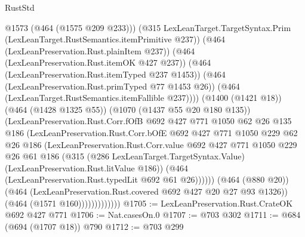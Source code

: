 \begin{lexlean}{RustStd}
\begin{coremodule}
                                  @1573
                                  (@464 (@1575 @209 @233)))
                                (@315
                                  LexLeanTarget.TargetSyntax.Prim
                                  (LexLeanTarget.RustSemantics.itemPrimitive @237))
                                (@464 (LexLeanPreservation.Rust.plainItem @237))
                                (@464 (LexLeanPreservation.Rust.itemOK @427 @237))
                                (@464 (LexLeanPreservation.Rust.itemTyped @237 @1453))
                                (@464 (LexLeanPreservation.Rust.primTyped @77 @1453 @26))
                                (@464 (LexLeanTarget.RustSemantics.itemFallible @237))))
                            (@1400 (@1421 @18))
                            (@464 (@1428 @1325 @55))
                            (@1070 (@1437 @55 @20 @180 @135))
                            (LexLeanPreservation.Rust.Corr.fOfB
                              @692
                              @427
                              @771
                              @1050
                              @62
                              @26
                              @135
                              @186
                              (LexLeanPreservation.Rust.Corr.bOfE
                                @692
                                @427
                                @771
                                @1050
                                @229
                                @62
                                @26
                                @186
                                (LexLeanPreservation.Rust.Corr.value
                                  @692
                                  @427
                                  @771
                                  @1050
                                  @229
                                  @26
                                  @61
                                  @186
                                  (@315
                                    (@286 LexLeanTarget.TargetSyntax.Value)
                                    (LexLeanPreservation.Rust.litValue @186))
                                  (@464 (LexLeanPreservation.Rust.typedLit @692 @61 @26))))))
                          (@464 (@880 @20))
                          (@464 (LexLeanPreservation.Rust.covered @692 @427 @20 @27 @93 @1326))
                          (@464 (@1571 @160)))))))))))))
@1705 := LexLeanPreservation.Rust.CrateOK @692 @427 @771
@1706 := Nat.casesOn.{0}
@1707 := @703 @302
@1711 := @684 (@694 (@1707 @18)) @790
@1712 := @703 @299

\end{coremodule}
\end{lexlean}
